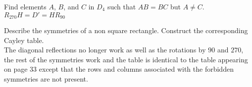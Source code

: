 \documentclass[12pt]{article}
\makeatletter
\theoremstyle{homework}
\newenvironment{exercise}[1]
{\def\@currentlabel{#1}\exercisecore}
{\endexercisecore}
\makeatother
\begin{document}
\begin{exercise}
{1.11}
Find elements $A$, $B$, and $C$ in $D_4$ such that $AB = BC$ but $A \neq C$.\\
$R_{270} H=D'=H R_{90}$
\end{exercise}

\begin{exercise}
{1.13}
Describe the symmetries of a non square rectangle. Construct the
corresponding Cayley table.\\
The diagonal reflections no longer work as well as the rotations by $90$ and $270$,  the rest of the symmetries work and the table is identical to the table appearing on page $33$ except that the rows and columns associated with the forbidden symmetries are not present.
\end{exercise}
\end{document}
